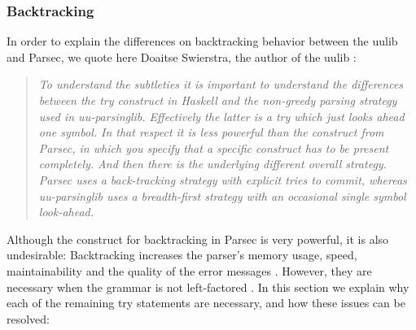 \subsubsection{Backtracking}
\label{design:backtracking}
In order to explain the differences on backtracking behavior between the uulib and Parsec, we quote here Doaitse Swierstra, the author of the uulib :
\begin{quote}
\textsl{%
  To understand the subtleties it is important to understand the differences between the try construct in Haskell and the non-greedy parsing strategy used in uu-parsinglib.
  Effectively the latter is a try which just looks ahead one symbol.
  In that respect it is less powerful than the  construct from Parsec, in which you specify that a specific construct has to be present completely.
  And then there is the underlying different overall strategy.
  Parsec uses a back-tracking strategy with explicit tries to commit, whereas uu-parsinglib uses a breadth-first strategy with an occasional single symbol look-ahead.
}
\end{quote}
Although the  construct for backtracking in Parsec is very powerful, it is also undesirable:
Backtracking increases the parser's memory usage, speed, maintainability and the quality of the error messages .
However, they are necessary when the grammar is not left-factored .
In this section we explain why each of the remaining try statements are necessary, and how these issues can be resolved:
